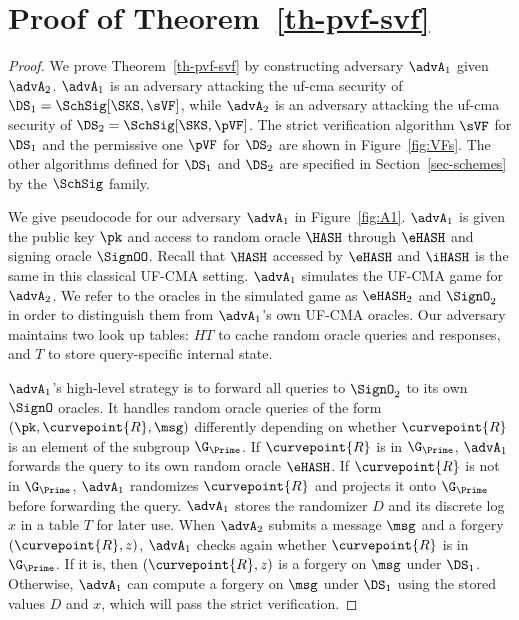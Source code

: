 
\section{Proof of Theorem~\ref{th-pvf-svf}}\label{sec-pvf-svf}

\begin{proof}
	
	We prove Theorem~\ref{th-pvf-svf} by constructing adversary $\advA_1$ given $\advA_2$.  $\advA_1$ is an adversary attacking the uf-cma security of $\DS_1= \SchSig[\SKS,\sVF]$, while $\advA_2$ is an adversary attacking the uf-cma security of $\DS_2= \SchSig[\SKS,\pVF]$. The strict verification algorithm $\sVF$ for $\DS_1$ and the permissive one $\pVF$ for  $\DS_2$ are shown in Figure~\ref{fig:VFs}. The other algorithms defined for $\DS_1$ and $\DS_2$ are specified in Section~\ref{sec-schemes} by the $\SchSig$ family.
	
	We give pseudocode for our adversary $\advA_1$ in Figure~\ref{fig:A1}. $\advA_1$ is given the public key $\pk$ and access to random oracle $\HASH$ through $\eHASH$ and signing oracle $\SignOO$. Recall that $\HASH$ accessed by $\eHASH$ and $\iHASH$ is the same in this classical UF-CMA setting. $\advA_1$ simulates the UF-CMA game for $\advA_2$. We refer to the oracles in the simulated game as $\eHASH_2$ and $\SignO_2$ in order to distinguish them from $\advA_1$'s own UF-CMA oracles. Our adversary maintains two look up tables: $HT$ to cache random oracle queries and responses, and $T$ to store query-specific internal state.
	
	$\advA_1$'s high-level strategy is to forward all queries to $\SignO_2$ to its own $\SignO$ oracles. It handles random oracle queries of the form $(\pk, \curvepoint{R}, \msg)$ differently depending on whether $\curvepoint{R}$ is an element of the subgroup $\G_\Prime$. If $\curvepoint{R}$ is in $\G_\Prime$, $\advA_1$ forwards the query to its own random oracle $\eHASH$. If $\curvepoint{R}$ is not in $\G_\Prime$, $\advA_1$ randomizes $\curvepoint{R}$ and projects it onto $\G_\Prime$ before forwarding the query. $\advA_1$ stores the randomizer $D$ and its discrete log $x$ in a table $T$ for later use. When $\advA_2$ submits a message $\msg$ and a forgery $(\curvepoint{R}, z)$, $\advA_1$ checks again whether $\curvepoint{R}$ is in $\G_\Prime$. If it is, then $(\curvepoint{R}, z)$ is a forgery on $\msg$ under $\DS_1$. Otherwise, $\advA_1$ can compute a forgery on $\msg$ under $\DS_1$ using the stored values $D$ and $x$, which will pass the strict verification.
	

\end{proof}
